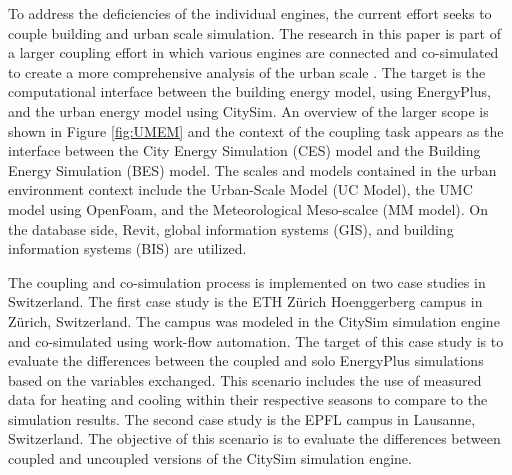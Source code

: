 \documentclass{tBPS2e}
\theoremstyle{plain}
\theoremstyle{definition}
\theoremstyle{remark}
\newcommand{\noteDT}[1]{\footnote{\textcolor{green}{#1}}}
\begin{document}
To address the deficiencies of the individual engines, the current
effort seeks to couple building and urban scale simulation. The research in
this paper is part of a larger coupling effort in which various engines are
connected and co-simulated to create a more comprehensive analysis of the
urban scale \citep{Dorer:2013vt,Allegrini:2012kx}. The target is the
computational interface between the building energy model, using EnergyPlus,
and the urban energy model using CitySim. An overview of the larger scope is
shown in Figure \ref{fig:UMEM} and the context of the coupling task appears as 
the interface between the City Energy Simulation (CES) model and the
Building Energy Simulation (BES) model. The scales and models contained in the 
urban environment context include the Urban-Scale Model (UC Model), the UMC model using OpenFoam, 
and the Meteorological Meso-scalce (MM model). On the database side, Revit, global 
information systems (GIS), and building information systems (BIS) are utilized.


The coupling and co-simulation process is implemented on two case studies in
Switzerland. The first case study is the ETH Z\"urich Hoenggerberg campus in
Z\"urich, Switzerland. The campus was modeled in the CitySim simulation engine
and co-simulated using work-flow automation. The target of this case study is
to evaluate the differences between the coupled and solo EnergyPlus
simulations based on the variables exchanged. This scenario includes the use
of measured data for heating and cooling within their respective seasons to
compare to the simulation results. The second case study is the EPFL campus in
Lausanne, Switzerland. The objective of this scenario is to evaluate the
differences between coupled and uncoupled versions of the CitySim simulation
engine.

\end{document}
